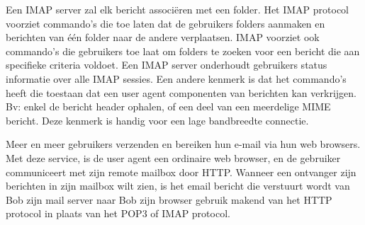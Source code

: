 
Een IMAP server zal elk bericht associëren met een folder. Het IMAP protocol voorziet commando’s die toe laten dat de gebruikers folders aanmaken en berichten van één folder naar de andere verplaatsen. IMAP voorziet ook commando’s die gebruikers toe laat om folders te zoeken voor een bericht die aan specifieke criteria voldoet. Een IMAP server onderhoudt gebruikers status informatie over alle IMAP sessies. Een andere kenmerk is dat het commando’s heeft die toestaan dat een user agent componenten van berichten kan verkrijgen. Bv: enkel de bericht header ophalen, of een deel van een meerdelige MIME bericht. Deze kenmerk is handig voor een lage bandbreedte connectie.


Meer en meer gebruikers verzenden en bereiken hun e-mail via hun web browsers. Met deze service, is de user agent een ordinaire web browser, en de gebruiker communiceert met zijn remote mailbox door HTTP. Wanneer een ontvanger zijn berichten in zijn mailbox wilt zien, is het email bericht die verstuurt wordt van Bob zijn mail server naar Bob zijn browser gebruik makend van het HTTP protocol in plaats van het POP3 of IMAP protocol.
